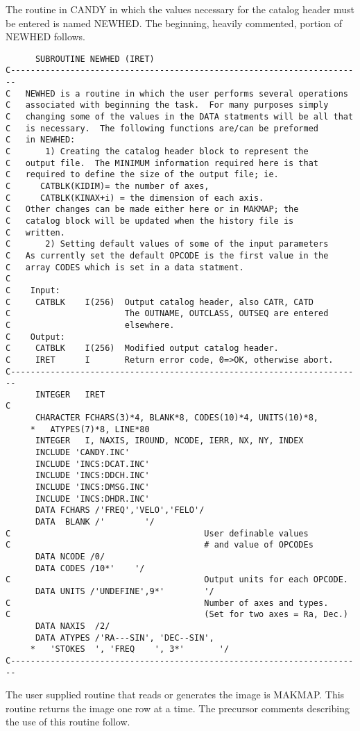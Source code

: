 The routine in CANDY in which the values necessary for the catalog
header must be entered is named NEWHED.  The beginning, heavily
commented, portion of NEWHED follows.
\begin{verbatim}
      SUBROUTINE NEWHED (IRET)
C-----------------------------------------------------------------------
C   NEWHED is a routine in which the user performs several operations
C   associated with beginning the task.  For many purposes simply
C   changing some of the values in the DATA statments will be all that
C   is necessary.  The following functions are/can be preformed
C   in NEWHED:
C       1) Creating the catalog header block to represent the
C   output file.  The MINIMUM information required here is that
C   required to define the size of the output file; ie.
C      CATBLK(KIDIM)= the number of axes,
C      CATBLK(KINAX+i) = the dimension of each axis.
C   Other changes can be made either here or in MAKMAP; the
C   catalog block will be updated when the history file is
C   written.
C       2) Setting default values of some of the input parameters
C   As currently set the default OPCODE is the first value in the
C   array CODES which is set in a data statment.
C
C    Input:
C     CATBLK    I(256)  Output catalog header, also CATR, CATD
C                       The OUTNAME, OUTCLASS, OUTSEQ are entered
C                       elsewhere.
C    Output:
C     CATBLK    I(256)  Modified output catalog header.
C     IRET      I       Return error code, 0=>OK, otherwise abort.
C-----------------------------------------------------------------------
      INTEGER   IRET
C
      CHARACTER FCHARS(3)*4, BLANK*8, CODES(10)*4, UNITS(10)*8,
     *   ATYPES(7)*8, LINE*80
      INTEGER   I, NAXIS, IROUND, NCODE, IERR, NX, NY, INDEX
      INCLUDE 'CANDY.INC'
      INCLUDE 'INCS:DCAT.INC'
      INCLUDE 'INCS:DDCH.INC'
      INCLUDE 'INCS:DMSG.INC'
      INCLUDE 'INCS:DHDR.INC'
      DATA FCHARS /'FREQ','VELO','FELO'/
      DATA  BLANK /'        '/
C                                       User definable values
C                                       # and value of OPCODEs
      DATA NCODE /0/
      DATA CODES /10*'    '/
C                                       Output units for each OPCODE.
      DATA UNITS /'UNDEFINE',9*'        '/
C                                       Number of axes and types.
C                                       (Set for two axes = Ra, Dec.)
      DATA NAXIS  /2/
      DATA ATYPES /'RA---SIN', 'DEC--SIN',
     *   'STOKES  ', 'FREQ    ', 3*'       '/
C-----------------------------------------------------------------------

\end{verbatim}
 The user supplied routine that reads or generates the image is
MAKMAP. This routine returns the image one row at a time.  The
precursor comments describing the use of this routine follow.

